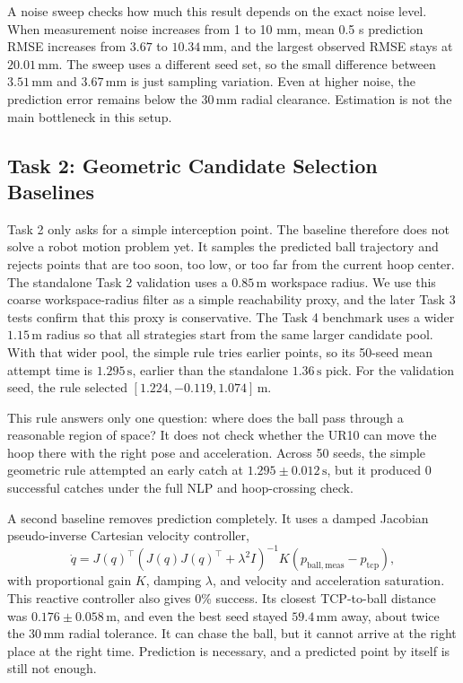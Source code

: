 \documentclass[a4paper,10pt]{article}
\begin{document}
A noise sweep checks how much this result depends on the exact noise level. When measurement noise increases from 1 to 10 mm, mean 0.5 s prediction RMSE increases from \(3.67\) to \(10.34\,\mathrm{mm}\), and the largest observed RMSE stays at \(20.01\,\mathrm{mm}\). The sweep uses a different seed set, so the small difference between \(3.51\,\mathrm{mm}\) and \(3.67\,\mathrm{mm}\) is just sampling variation. Even at higher noise, the prediction error remains below the \(30\,\mathrm{mm}\) radial clearance. Estimation is not the main bottleneck in this setup.

\subsection*{Task 2: Geometric Candidate Selection Baselines}

Task 2 only asks for a simple interception point. The baseline therefore does not solve a robot motion problem yet. It samples the predicted ball trajectory and rejects points that are too soon, too low, or too far from the current hoop center. The standalone Task 2 validation uses a \(0.85\,\mathrm{m}\) workspace radius. We use this coarse workspace-radius filter as a simple reachability proxy, and the later Task 3 tests confirm that this proxy is conservative. The Task 4 benchmark uses a wider \(1.15\,\mathrm{m}\) radius so that all strategies start from the same larger candidate pool. With that wider pool, the simple rule tries earlier points, so its 50-seed mean attempt time is \(1.295\,\mathrm{s}\), earlier than the standalone \(1.36\,\mathrm{s}\) pick. For the validation seed, the rule selected \([1.224,-0.119,1.074]\,\mathrm{m}\).

This rule answers only one question: where does the ball pass through a reasonable region of space? It does not check whether the UR10 can move the hoop there with the right pose and acceleration. Across 50 seeds, the simple geometric rule attempted an early catch at \(1.295\pm0.012\,\mathrm{s}\), but it produced 0 successful catches under the full NLP and hoop-crossing check.

A second baseline removes prediction completely. It uses a damped Jacobian pseudo-inverse Cartesian velocity controller,
\begin{equation}
\dot q = J(q)^\top\left(J(q)J(q)^\top+\lambda^2I\right)^{-1}K(p_{\mathrm{ball,meas}}-p_{\mathrm{tcp}}),
\label{eq:reactive}
\end{equation}
with proportional gain \(K\), damping \(\lambda\), and velocity and acceleration saturation. This reactive controller also gives 0\% success. Its closest TCP-to-ball distance was \(0.176\pm0.058\,\mathrm{m}\), and even the best seed stayed \(59.4\,\mathrm{mm}\) away, about twice the \(30\,\mathrm{mm}\) radial tolerance. It can chase the ball, but it cannot arrive at the right place at the right time. Prediction is necessary, and a predicted point by itself is still not enough.
\end{document}
